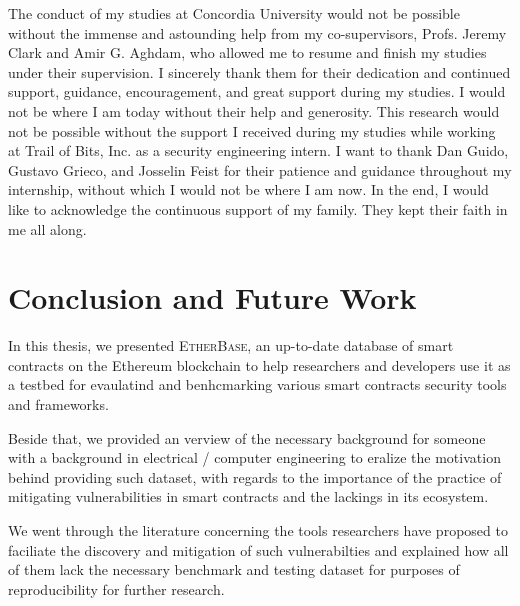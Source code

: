 \documentclass[letterpaper,12pt,onecolumn,final]{report}
\newcommand{\etherbase}{{\scshape EtherBase\xspace}}
\begin{document}
\begin{acknowledgments}
  	The conduct of my studies at Concordia University would not be possible without the immense and astounding help from my co-supervisors, Profs. Jeremy Clark and Amir G. Aghdam, who allowed me to resume and finish my studies under their supervision.
  	I sincerely thank them for their dedication and continued support, guidance, encouragement, and great support during my studies.
	I would not be where I am today without their help and generosity.
	This research would not be possible without the support I received during my studies while working at Trail of Bits, Inc. as a security engineering intern.
	I want to thank Dan Guido, Gustavo Grieco, and Josselin Feist for their patience and guidance throughout my internship, without which I would not be where I am now.
	In the end, I would like to acknowledge the continuous support of my family.
	They kept their faith in me all along.
\end{acknowledgments}










%


\chapter{Conclusion and Future Work}
\label{chap:conclusion}

In this thesis, we presented \etherbase, an up-to-date database of smart contracts on the Ethereum blockchain to help researchers and developers use it as a testbed for evaulatind and benhcmarking various smart contracts security tools and frameworks.

Beside that, we provided an verview of the necessary background for someone with a background in electrical / computer engineering to eralize the motivation behind providing such dataset, with regards to the importance of the practice of mitigating vulnerabilities in smart contracts and the lackings in its ecosystem.

We went through the literature concerning the tools researchers have proposed to faciliate the discovery and mitigation of such vulnerabilties and explained how all of them lack the necessary benchmark and testing dataset for purposes of reproducibility for further research.
\end{document}
